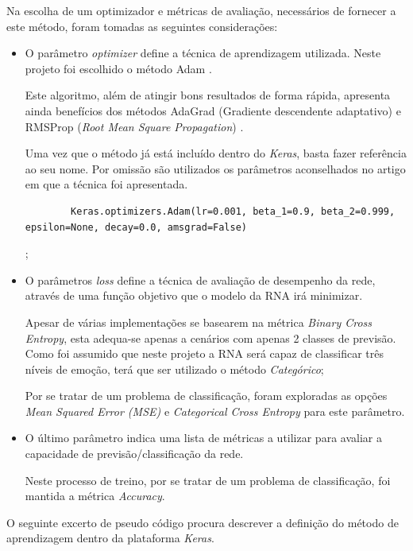 Na escolha de um optimizador e métricas de avaliação, necessários de fornecer a este método, foram tomadas as seguintes considerações:
\begin{itemize}

    \item O parâmetro \textit{optimizer} define a técnica de aprendizagem utilizada. Neste projeto foi escolhido o método Adam \cite{adam2}. 
    
    Este algoritmo, além de atingir bons resultados de forma rápida, apresenta ainda benefícios dos métodos AdaGrad (Gradiente descendente adaptativo) e RMSProp (\textit{Root Mean Square Propagation}) \cite{adam1}.
    
    Uma vez que o método já está incluído dentro do \textit{Keras}, basta fazer referência ao seu nome. Por omissão são utilizados os parâmetros aconselhados no artigo em que a técnica foi apresentada.
    
    \begin{verbatim} 
        Keras.optimizers.Adam(lr=0.001, beta_1=0.9, beta_2=0.999, epsilon=None, decay=0.0, amsgrad=False)
    \end{verbatim};
    
    \item O parâmetros \textit{loss} define a técnica de avaliação de desempenho da rede, através de uma função objetivo que o modelo da RNA irá minimizar.
    
    Apesar de várias implementações se basearem na métrica \textit{Binary Cross Entropy}, esta adequa-se apenas a cenários com apenas 2 classes de previsão. Como foi assumido que neste projeto a RNA será capaz de classificar três níveis de emoção, terá que ser utilizado o método \textit{Categórico};
    
    Por se tratar de um problema de classificação, foram exploradas as opções \textit{Mean Squared Error (MSE)} e \textit{Categorical Cross Entropy} para este parâmetro.
        
    \item O último parâmetro indica uma lista de métricas a utilizar para avaliar a capacidade de previsão/classificação da rede. 
    
    Neste processo de treino, por se tratar de um problema de classificação, foi mantida a métrica \textit{Accuracy}. 
    
\end{itemize}

O seguinte excerto de pseudo código procura descrever a definição do método de aprendizagem dentro da plataforma \textit{Keras}.

